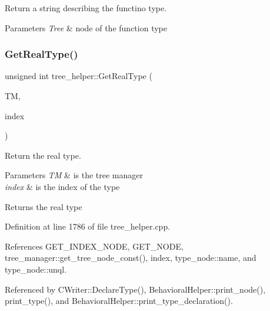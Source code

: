 Return a string describing the functino type. 


\begin{DoxyParams}{Parameters}
{\em Tree} & node of the function type \\
\hline
\end{DoxyParams}
\mbox{\label{classtree__helper_a0b08c720b4d1a44705b5bbc47b915f79}} 
\subsubsection{\texorpdfstring{Get\+Real\+Type()}{GetRealType()}}
{\footnotesize\ttfamily unsigned int tree\+\_\+helper\+::\+Get\+Real\+Type (\begin{DoxyParamCaption}\item[{const \hyperlink{tree__manager_8hpp_a792e3f1f892d7d997a8d8a4a12e39346}{tree\+\_\+manager\+Const\+Ref} \&}]{TM,  }\item[{unsigned int}]{index }\end{DoxyParamCaption})\hspace{0.3cm}{\ttfamily [static]}}



Return the real type. 


\begin{DoxyParams}{Parameters}
{\em TM} & is the tree manager \\
\hline
{\em index} & is the index of the type \\
\hline
\end{DoxyParams}
\begin{DoxyReturn}{Returns}
the real type 
\end{DoxyReturn}


Definition at line 1786 of file tree\+\_\+helper.\+cpp.



References G\+E\+T\+\_\+\+I\+N\+D\+E\+X\+\_\+\+N\+O\+DE, G\+E\+T\+\_\+\+N\+O\+DE, tree\+\_\+manager\+::get\+\_\+tree\+\_\+node\+\_\+const(), index, type\+\_\+node\+::name, and type\+\_\+node\+::unql.



Referenced by C\+Writer\+::\+Declare\+Type(), Behavioral\+Helper\+::print\+\_\+node(), print\+\_\+type(), and Behavioral\+Helper\+::print\+\_\+type\+\_\+declaration().

